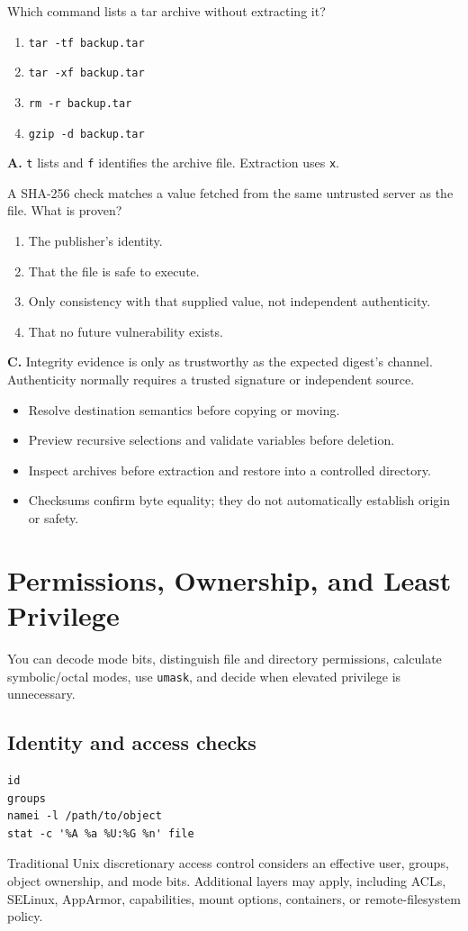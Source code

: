 \documentclass[11pt,oneside,openany]{book}
\newcommand{\fourchoices}[4]{%
  \begin{enumerate}[label=\Alph*),leftmargin=2em,itemsep=0.25em]
    \item #1
    \item #2
    \item #3
    \item #4
  \end{enumerate}}
\newcommand{\chaptergoals}[1]{%
  \begin{tcolorbox}[colback=Paper,colframe=Blue,title={Learning outcomes},fonttitle=\bfseries]
  #1
  \end{tcolorbox}}
\begin{document}
\begin{questionbox}[title={Medium 6.1 -- Archive inspection}]
Which command lists a tar archive without extracting it?
\fourchoices{\texttt{tar -tf backup.tar}}{\texttt{tar -xf backup.tar}}{\texttt{rm -r backup.tar}}{\texttt{gzip -d backup.tar}}
\end{questionbox}
\begin{answerbox}
\textbf{A.} \texttt{t} lists and \texttt{f} identifies the archive file. Extraction uses \texttt{x}.
\end{answerbox}

\begin{questionbox}[title={Hard 6.2 -- Hash meaning}]
A SHA-256 check matches a value fetched from the same untrusted server as the file. What is proven?
\fourchoices{The publisher's identity.}{That the file is safe to execute.}{Only consistency with that supplied value, not independent authenticity.}{That no future vulnerability exists.}
\end{questionbox}
\begin{answerbox}
\textbf{C.} Integrity evidence is only as trustworthy as the expected digest's channel. Authenticity normally requires a trusted signature or independent source.
\end{answerbox}

\begin{recapbox}
\begin{itemize}
  \item Resolve destination semantics before copying or moving.
  \item Preview recursive selections and validate variables before deletion.
  \item Inspect archives before extraction and restore into a controlled directory.
  \item Checksums confirm byte equality; they do not automatically establish origin or safety.
\end{itemize}
\end{recapbox}

\chapter{Permissions, Ownership, and Least Privilege}
\chaptergoals{You can decode mode bits, distinguish file and directory permissions, calculate symbolic/octal modes, use \texttt{umask}, and decide when elevated privilege is unnecessary.}

\section{Identity and access checks}
\begin{lstlisting}
id
groups
namei -l /path/to/object
stat -c '%A %a %U:%G %n' file
\end{lstlisting}
Traditional Unix discretionary access control considers an effective user, groups, object ownership, and mode bits. Additional layers may apply, including ACLs, SELinux, AppArmor, capabilities, mount options, containers, or remote-filesystem policy.
\end{document}
